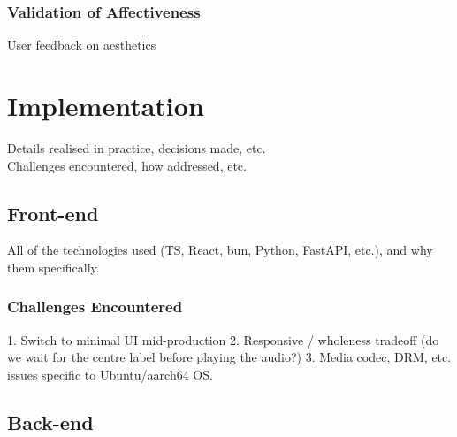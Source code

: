         \subsubsection{Validation of Affectiveness}
            \begin{temp}
                User feedback on aesthetics
            \end{temp}
    
    
    \section{Implementation}
        \begin{temp}
            Details realised in practice, decisions made, etc.\\
            Challenges encountered, how addressed, etc.
        \end{temp}
    
        \subsection{Front-end}
    
            \begin{temp}
                All of the technologies used (TS, React, bun, Python, FastAPI, etc.), and why them specifically.
            \end{temp}
        
            \subsubsection{Challenges Encountered}
                \begin{temp}
                    1. Switch to minimal UI mid-production
                    2. Responsive / wholeness tradeoff (do we wait for the centre label before playing the audio?)
                    3. Media codec, DRM, etc. issues specific to Ubuntu/aarch64 OS.
                \end{temp}
    
        \subsection{Back-end} %
    
